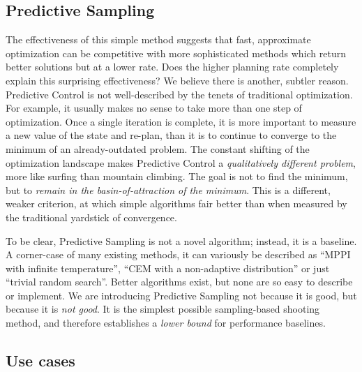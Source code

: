 \subsection{Predictive Sampling}
The effectiveness of this simple method suggests that fast, approximate optimization can be competitive with more sophisticated methods which return better solutions but at a lower rate. Does the higher planning rate completely explain this surprising effectiveness? We believe there is another, subtler reason. Predictive Control is not well-described by the tenets of traditional optimization. For example, it usually makes no sense to take more than one step of optimization. Once a single iteration is complete, it is more important to measure a new value of the state and re-plan, than it is to continue to converge to the minimum of an already-outdated problem. The constant shifting of the optimization landscape makes Predictive Control a \emph{qualitatively different problem}, more like surfing than mountain climbing. The goal is not to find the minimum, but to \emph{remain in the basin-of-attraction of the minimum}. This is a different, weaker criterion, at which simple algorithms fair better than when measured by the traditional yardstick of convergence.

To be clear, Predictive Sampling is not a novel algorithm; instead, it is a baseline. A corner-case of many existing methods, it can variously be described as ``MPPI with infinite temperature'',  ``CEM with a non-adaptive distribution'' or just ``trivial random search''. Better algorithms exist, but none are so easy to describe or implement. We are introducing Predictive Sampling not because it is good, but because it is \emph{not good}. It is the simplest possible sampling-based shooting method, and therefore establishes a \emph{lower bound} for performance baselines.

\subsection{Use cases} \label{ps_current}

